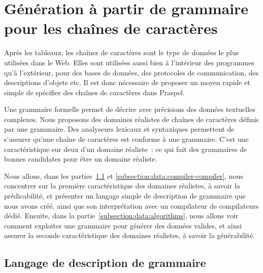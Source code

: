 \section{Génération à partir de grammaire pour les chaînes de caractères}
\label{section:data:strings}

Après les tableaux, les chaînes de caractères sont le type de données le plus
utilisées dans le Web. Elles sont utilisées aussi bien à l'intérieur des
programmes qu'à l'extérieur, pour des bases de données, des protocoles de
communication, des descriptions d'objets etc. Il est donc nécessaire de proposer
un moyen rapide et simple de spécifier des chaînes de caractères dans Praspel.

Une grammaire formelle permet de décrire avec précisions des données textuelles
complexes. Nous proposons des domaines réalistes de chaînes de caractères
définis par une grammaire. Des analyseurs lexicaux et syntaxiques permettent de
s'assurer qu'une chaîne de caractères est conforme à une grammaire. C'est une
caractéristique sur deux d'un domaine réaliste~: ce qui fait des grammaires de
bonnes candidates pour être un domaine réaliste.

Nous allons, dans les parties~\ref{subsection:data:pp} et
\ref{subsection:data:compiler-compiler}, nous concentrer sur la première
caractéristique des domaines réalistes, à savoir la prédicabilité, et présenter
un langage simple de description de grammaire que nous avons créé, ainsi que son
interprétation avec un compilateur de compilateurs dédié. Ensuite, dans la
partie~\ref{subsection:data:algorithms}, nous allons voir comment exploiter une
grammaire pour générer des données valides, et ainsi assurer la seconde
caractéristique des domaines réalistes, à savoir la générabilité.

\subsection{Langage de description de grammaire}
\label{subsection:data:pp}

